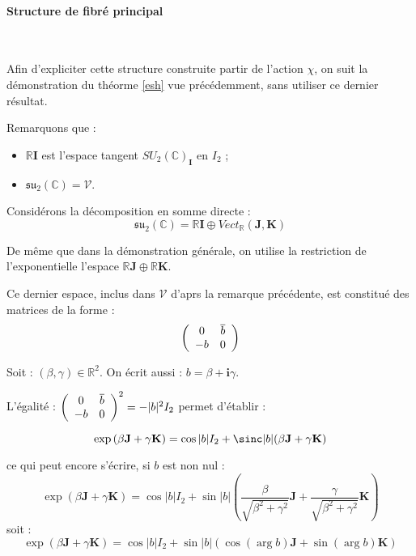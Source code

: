 \etoile
\paragraph{Structure de fibr\'e principal}~\\

\par
Afin d'expliciter cette structure construite  partir de l'action $\chi$, %
on suit la d\'emonstration du th\'eorme \ref{esh} vue pr\'ec\'edemment, sans utiliser ce dernier r\'esultat.

\par
Remarquons que :
\begin{itemize}
\item $\mathbb{R}\mathbf{I}$ est l'espace tangent  $SU_2(\mathbb{C})_{\mathbf{I}}$ en $I_2$ ;
\item $\mathfrak{su}_2(\mathbb{C})=\mathcal{V}$.
\end{itemize}

\par
Consid\'erons la d\'ecomposition en somme directe :
\[\mathfrak{su}_2(\mathbb{C})=\mathbb{R}\mathbf{I}\oplus Vect_{\mathbb{R}}(\mathbf{J},\mathbf{K})\]

\par
De m\^eme que dans la d\'emonstration g\'en\'erale, on utilise la restriction de l'exponentielle  l'espace $\mathbb{R}\mathbf{J}\oplus\mathbb{R}\mathbf{K}$.

\par
Ce dernier espace, inclus dans $\mathcal{V}$ d'aprs la remarque pr\'ec\'edente, est constitu\'e des matrices de la forme :
\[\left(\begin{array}{cc}0&\overline{b}\\-b&0\end{array}\right)\]

Soit : $(\beta,\gamma)\in\mathbb{R}^2$. On \'ecrit aussi : $b=\beta+\mathbf{i}\gamma$.

\par
L'\'egalit\'e : $\left(\begin{array}{cc}0&\overline{b}\\-b&0\end{array}\right)^2=-|b|^2I_2$ permet d'\'etablir :

\[\exp\left(\beta\mathbf{J}+\gamma\mathbf{K}\right)=\cos |b|I_2+\sinc |b|(\beta\mathbf{J}+\gamma\mathbf{K})\]

ce qui peut encore s'\'ecrire, si $b$ est non nul :
\[\exp\left(\beta\mathbf{J}+\gamma\mathbf{K}\right)=\cos |b|I_2+\sin|b|\left(\frac{\beta}{\sqrt{\beta^2+\gamma^2}}\mathbf{J}+\frac{\gamma}{\sqrt{\beta^2+\gamma^2}}\mathbf{K}\right)\]
soit :
\[\exp\left(\beta\mathbf{J}+\gamma\mathbf{K}\right)=\cos |b|I_2+\sin|b|\left(\cos\left(\arg b\right)\mathbf{J}+\sin\left(\arg b\right)\mathbf{K}\right)\]

